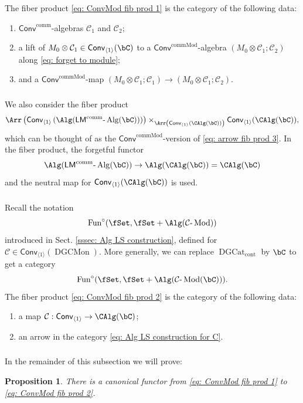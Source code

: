 \documentclass[10pt]{amsart}
\newcommand{\sssec}{\subsubsection}
\newtheorem{prop}[subsubsection]{Proposition}
\theoremstyle{remark}
\newcommand{\on}{\operatorname}
\newcommand{\cC}{\mathcal{C}}
\newcommand{\DGcat}{\on{DGCat}_{\on{cont}}}
\newcommand{\DGCatSymMon}{\on{DGCMon}}
\newcommand{\lMod}{\text{-}\on{Mod}}
\newcommand{\lAlg}{\text{-}\on{Alg}}
\newcommand{\Fun}{\on{Fun}}
\newcommand{\Conv}{\mathsf{Conv}}
\newcommand{\Convcomm}{\mathsf{Conv}^{\on{comm}}}
\newcommand{\ConvcMod}{\mathsf{Conv}^{\on{commMod}}}
\newcommand{\LMcomm}{\mathsf{LM}^{\on{comm}}}
\begin{document}
\sssec{}\label{sssec: ConvMod fib 1 data}
The fiber product \eqref{eq: ConvMod fib prod 1} is the category of the following data:
\begin{enumerate}
    \item $\Convcomm$-algebras $\cC_1$ and $\cC_2$;
    \item a lift of $M_0\otimes \cC_1\in \Conv_{\langle 1\rangle}(\bC)$ to a $\ConvcMod$-algebra $(M_0\otimes \cC_1;\cC_2)$ along \eqref{eq: forget to module};
    \item and a $\ConvcMod$-map $(M_0\otimes \cC_1;\cC_1)\rightarrow (M_0\otimes \cC_1;\cC_2)$.
\end{enumerate}

\sssec{}
We also consider the fiber product
\begin{equation}\label{eq: ConvMod fib prod 2}
    \Arr\left(\Conv_{\langle 1\rangle}\left(\Alg(\LMcomm\lAlg(\bC))\right)\right)\times_{\Arr\left(\Conv_{\langle 1\rangle}(\CAlg(\bC))\right)} \Conv_{\langle 1\rangle}(\CAlg(\bC)),
\end{equation}
which can be thought of as the $\ConvcMod$-version of \eqref{eq: arrow fib prod 3}. In the fiber product, the forgetful functor
\[\Alg(\LMcomm\lAlg(\bC))\rightarrow \Alg(\CAlg(\bC))=\CAlg(\bC)\]
and the neutral map for $\Conv_{\langle 1\rangle}(\CAlg(\bC))$ is used. 

\sssec{}\label{sssec: ConvMod fib 2 data}
Recall the notation
 \[\Fun^{\circ}(\fSet,\fSet+\Alg(\cC\lMod))\]
 introduced in Sect. \ref{sssec: Alg LS construction}, defined for $\cC\in\Conv_{\langle 1\rangle}(\DGCatSymMon)$. More generally, we can replace $\DGcat$ by $\bC$ to get a category
 \begin{equation}\label{eq: Alg LS construction for C}
     \Fun^{\circ}(\fSet,\fSet+\Alg(\cC\lMod(\bC))).
 \end{equation}
The fiber product \eqref{eq: ConvMod fib prod 2} is the category of the following data:
\begin{enumerate}
    \item a map $\cC:\Conv_{\langle 1\rangle}\rightarrow \CAlg(\bC)$;
    \item an arrow in the category \eqref{eq: Alg LS construction for C}.
\end{enumerate}

\sssec{}
In the remainder of this subsection we will prove:

\begin{prop}\label{prop: extension mechanism}
    There is a canonical functor from \eqref{eq: ConvMod fib prod 1} to \eqref{eq: ConvMod fib prod 2}.
\end{prop}
\end{document}
